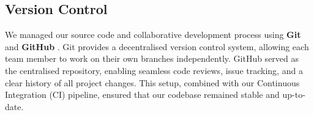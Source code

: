     \subsection{Version Control}
        We managed our source code and collaborative development process using \textbf{Git} \cite{git} and \textbf{GitHub} \cite{github}. Git provides a decentralised version control system, allowing each team member to work on their own branches independently. GitHub served as the centralised repository, enabling seamless code reviews, issue tracking, and a clear history of all project changes. This setup, combined with our Continuous Integration (CI) pipeline, ensured that our codebase remained stable and up-to-date.






    
